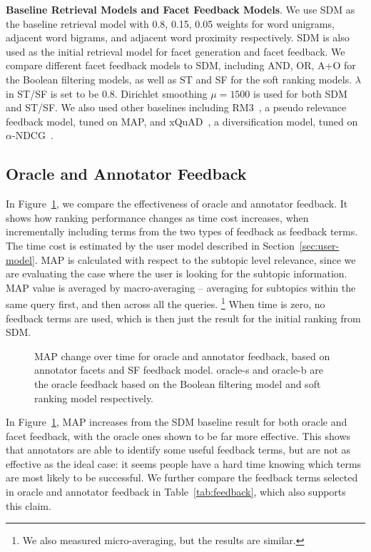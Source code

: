 \textbf{Baseline Retrieval Models and Facet Feedback Models}. We use SDM as the baseline retrieval model with 0.8, 0.15, 0.05 weights for word unigrams, adjacent word bigrams, and adjacent word proximity respectively. SDM is also used as the initial retrieval model for facet generation and facet feedback. We compare different facet feedback models to SDM, including AND, OR, A+O for the Boolean filtering models, as well as ST and SF for the soft ranking models. $\lambda$ in ST/SF is set to be 0.8. Dirichlet smoothing $\mu=1500$ is used for both SDM and ST/SF. We also used other baselines including RM3~\cite{abdul2004umass,lavrenko2001relevance}, a pseudo relevance feedback model, tuned on MAP, and xQuAD~\cite{santos2010exploiting}, a diversification model, tuned on $\alpha$-NDCG~\cite{clarke2008novelty}.

\subsection{Oracle and Annotator Feedback}
In Figure~\ref{fig:feedback}, we compare the effectiveness of oracle and annotator feedback. It shows how ranking performance changes as time cost increases, when incrementally including terms from the two types of feedback as feedback terms. The time cost is estimated by the user model described in Section~\ref{sec:user-model}. MAP is calculated with respect to the subtopic level relevance, since we are evaluating the case where the user is looking for the subtopic information. MAP value is averaged by macro-averaging -- averaging for subtopics within the same query first, and then across all the queries. \footnote{We also measured micro-averaging, but the results are similar.} When time is zero, no feedback terms are used, which is then just the result for the initial ranking from SDM.
\begin{figure}[H]
\centering
\caption{MAP change over time for oracle and annotator feedback, based on annotator facets and SF feedback model. oracle-s and oracle-b are the oracle feedback based on the Boolean filtering model and soft ranking model respectively.}
\label{fig:feedback}
\end{figure}

In Figure~\ref{fig:feedback}, MAP increases from the SDM baseline result for both oracle and facet feedback, with the oracle ones shown to be far more effective. This shows that annotators are able to identify some useful feedback terms, but are not as effective as the ideal case: it seems people have a hard time knowing which terms are most likely to be successful. We further compare the feedback terms selected in oracle and annotator feedback in Table~\ref{tab:feedback}, which also supports this claim.

